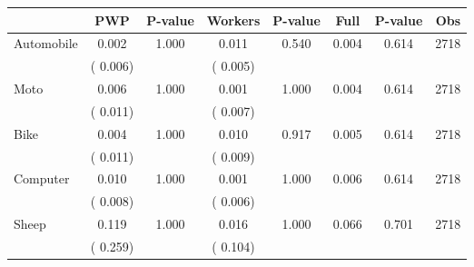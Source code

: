 
\begin{tabular}{l*{7}{c}}\hline&\multicolumn{1}{c}{PWP}&\multicolumn{1}{c}{P-value}&\multicolumn{1}{c}{Workers}&\multicolumn{1}{c}{P-value}&\multicolumn{1}{c}{Full}&\multicolumn{1}{c}{P-value}&\multicolumn{1}{c}{Obs} \\ \hline

 Automobile       &              0.002       &        1.000  &              0.011       &        0.540  &              0.004       &              0.614 &  2718 \\ 
                       &       (       0.006)             &                               &       (       0.005)                     &                               &                                               &                                &                      \\ 

 Moto       &              0.006       &        1.000  &              0.001       &        1.000  &              0.004       &              0.614 &  2718 \\ 
                       &       (       0.011)             &                               &       (       0.007)                     &                               &                                               &                                &                      \\ 

 Bike       &              0.004       &        1.000  &              0.010       &        0.917  &              0.005       &              0.614 &  2718 \\ 
                       &       (       0.011)             &                               &       (       0.009)                     &                               &                                               &                                &                      \\ 

 Computer       &              0.010       &        1.000  &              0.001       &        1.000  &              0.006       &              0.614 &  2718 \\ 
                       &       (       0.008)             &                               &       (       0.006)                     &                               &                                               &                                &                      \\ 

 Sheep       &              0.119       &        1.000  &              0.016       &        1.000  &              0.066       &              0.701 &  2718 \\ 
                       &       (       0.259)             &                               &       (       0.104)                     &                               &                                               &                                &                      \\ 


\end{tabular}
